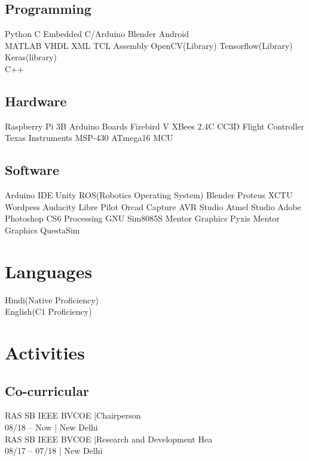\documentclass[]{deedy-resume-openfont}
\begin{document}
\begin{minipage}[t]{0.33\textwidth} 



\subsection{Programming}
Python \textbullet{}   C \textbullet{} Embedded C/Arduino \textbullet{} Blender \textbullet{}Android \\ 
  MATLAB\textbullet{} VHDL \textbullet{} XML \textbullet{} TCL \textbullet{} Assembly \textbullet{} OpenCV(Library) \textbullet{} Tensorflow(Library) \textbullet{} Keras(library) \\
C++ \textbullet{} 
\sectionsep
\subsection{Hardware}
Raspberry Pi 3B\textbullet{}
Arduino Boards\textbullet{}
Firebird V\textbullet{}
XBees 2.4C\textbullet{}
CC3D Flight Controller\textbullet{}
Texas Instruments MSP-430\textbullet{}
ATmega16 MCU
\sectionsep
\subsection{Software}
Arduino IDE\textbullet{}
Unity\textbullet{}
ROS(Robotics Operating System)\textbullet{}
Blender\textbullet{}
Proteus\textbullet{}
XCTU\textbullet{}
Wordpess\textbullet{}
Audacity\textbullet{}
Libre Pilot\textbullet{}
Orcad Capture\textbullet{}
AVR Studio\textbullet{}
Atmel Studio\textbullet{}
Adobe Photoshop CS6\textbullet{}
Processing\textbullet{}
GNU Sim8085S\textbullet{}
Mentor Graphics Pyxis\textbullet{}
Mentor Graphics QuestaSim
\hline
\section{Languages}
\textbullet{}Hindi(Native Proficiency)\\
\textbullet{}English(C1 Proficiency)
\sectionsep

\hline
\section{Activities}
\vspace{0.05in}
\subsection{Co-curricular}
RAS SB IEEE BVCOE |Chairperson\\ 
08/18 – Now | New Delhi\\
\vspace{0.1in}
RAS SB IEEE BVCOE |Research and Development Hea\\ 
08/17 – 07/18 | New Delhi\\
\vspace{0.1in}

\end{minipage}
\end{document}
